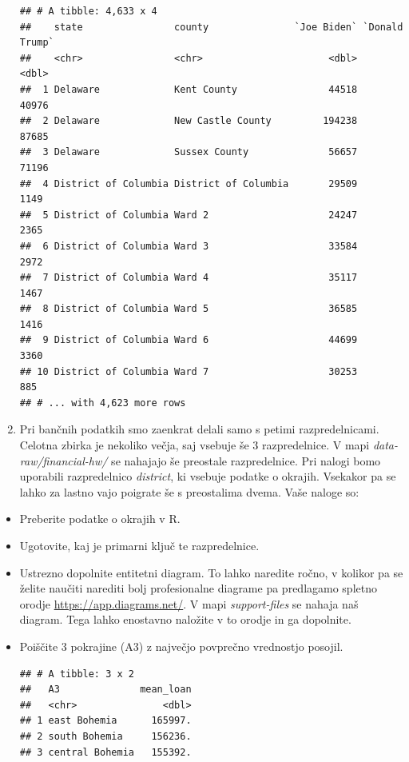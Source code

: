 \documentclass[
]{book}
\begin{document}
\begin{enumerate}
\begin{verbatim}
## # A tibble: 4,633 x 4
##    state                county               `Joe Biden` `Donald Trump`
##    <chr>                <chr>                      <dbl>          <dbl>
##  1 Delaware             Kent County                44518          40976
##  2 Delaware             New Castle County         194238          87685
##  3 Delaware             Sussex County              56657          71196
##  4 District of Columbia District of Columbia       29509           1149
##  5 District of Columbia Ward 2                     24247           2365
##  6 District of Columbia Ward 3                     33584           2972
##  7 District of Columbia Ward 4                     35117           1467
##  8 District of Columbia Ward 5                     36585           1416
##  9 District of Columbia Ward 6                     44699           3360
## 10 District of Columbia Ward 7                     30253            885
## # ... with 4,623 more rows
\end{verbatim}
\item
  Pri bančnih podatkih smo zaenkrat delali samo s petimi razpredelnicami. Celotna zbirka je nekoliko večja, saj vsebuje še 3 razpredelnice. V mapi \emph{data-raw/financial-hw/} se nahajajo še preostale razpredelnice. Pri nalogi bomo uporabili razpredelnico \emph{district}, ki vsebuje podatke o okrajih. Vsekakor pa se lahko za lastno vajo poigrate še s preostalima dvema. Vaše naloge so:
\end{enumerate}

\begin{itemize}
\item
  Preberite podatke o okrajih v R.
\item
  Ugotovite, kaj je primarni ključ te razpredelnice.
\item
  Ustrezno dopolnite entitetni diagram. To lahko naredite ročno, v kolikor pa se želite naučiti narediti bolj profesionalne diagrame pa predlagamo spletno orodje \url{https://app.diagrams.net/}. V mapi \emph{support-files} se nahaja naš diagram. Tega lahko enostavno naložite v to orodje in ga dopolnite.
\item
  Poiščite 3 pokrajine (A3) z največjo povprečno vrednostjo posojil.

\begin{verbatim}
## # A tibble: 3 x 2
##   A3              mean_loan
##   <chr>               <dbl>
## 1 east Bohemia      165997.
## 2 south Bohemia     156236.
## 3 central Bohemia   155392.
\end{verbatim}
\end{itemize}
\end{document}
